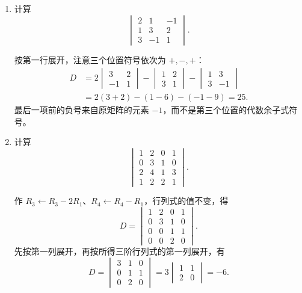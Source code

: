 \documentclass[UTF8,12pt,a4paper,fontset=fandol]{ctexart}
\begin{document}
\begin{enumerate}[label=\arabic*.]

\item\label{q:detcalc-three}
计算
\[
\begin{vmatrix}
2&1&-1\\
1&3&2\\
3&-1&1
\end{vmatrix}.
\]

\begin{solve}
按第一行展开，注意三个位置符号依次为 $+,-,+$：
\begin{align*}
D&=2\begin{vmatrix}3&2\\-1&1\end{vmatrix}
-\begin{vmatrix}1&2\\3&1\end{vmatrix}
-\begin{vmatrix}1&3\\3&-1\end{vmatrix}\\
&=2(3+2)-(1-6)-(-1-9)=\boxed{25}.
\end{align*}
最后一项前的负号来自原矩阵的元素 $-1$，而不是第三个位置的代数余子式符号。
\end{solve}

\item\label{q:detcalc-four}
计算
\[
\begin{vmatrix}
1&2&0&1\\
0&3&1&0\\
2&4&1&3\\
1&2&2&1
\end{vmatrix}.
\]

\begin{solve}
作 $R_3\leftarrow R_3-2R_1$、$R_4\leftarrow R_4-R_1$，行列式的值不变，得
\[
D=\begin{vmatrix}
1&2&0&1\\
0&3&1&0\\
0&0&1&1\\
0&0&2&0
\end{vmatrix}.
\]
先按第一列展开，再按所得三阶行列式的第一列展开，有
\[
D=\begin{vmatrix}3&1&0\\0&1&1\\0&2&0\end{vmatrix}
=3\begin{vmatrix}1&1\\2&0\end{vmatrix}=\boxed{-6}.
\]
\end{solve}


\end{enumerate}
\end{document}
